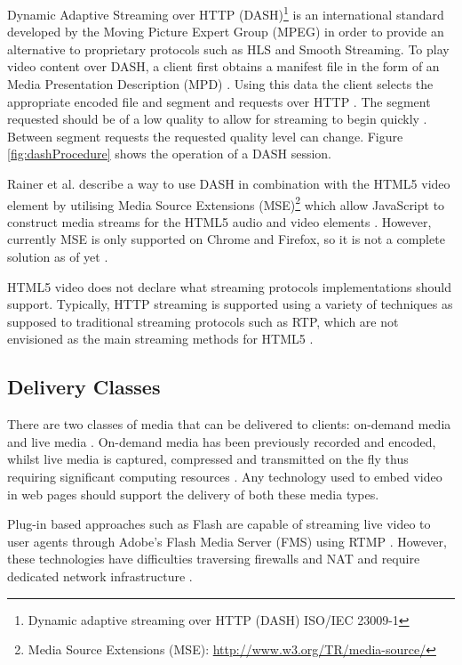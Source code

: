 \documentclass[journal]{IEEEtran}
\begin{document}
Dynamic Adaptive Streaming over HTTP (DASH)\footnote{Dynamic
adaptive streaming over HTTP (DASH) ISO/IEC 23009-1} is an international standard developed by the Moving Picture Expert Group (MPEG) in order to provide an alternative to proprietary protocols such as HLS and Smooth Streaming. To play video content over DASH, a client first obtains a manifest file in the form of an Media Presentation Description (MPD) \cite{article:MPEGDASH}. Using this data the client selects the appropriate encoded file and segment and requests over HTTP \cite{article:MPEGDASH}. The segment requested should be of a low quality to allow for streaming to begin quickly \cite{inproceedings:dynamicAdapativeHTTPStreamingLive}. Between segment requests the requested quality level can change. Figure \ref{fig:dashProcedure} shows the operation of a DASH session.

Rainer et al. describe a way to use DASH in combination with the HTML5 video element by utilising Media Source Extensions (MSE)\footnote{Media Source Extensions (MSE): \url{http://www.w3.org/TR/media-source/}} which allow JavaScript to construct media streams for the HTML5 audio and video elements \cite{standard:mse} \cite{inproceedings:aSeamlessIntegrationOfAdaptiveHTTPStreaming}. However, currently MSE is only supported on Chrome and Firefox, so it is not a complete solution as of yet \cite{website:mdnMediaSource}.

HTML5 video does not declare what streaming protocols implementations should support. Typically, HTTP streaming is supported using a variety of techniques as supposed to traditional streaming protocols such as RTP, which are not envisioned as the main streaming methods for HTML5 \cite{article:towardsVideoOnTheWebWithHTML5}.

\subsection{Delivery Classes}
There are two classes of media that can be delivered to clients: on-demand media and live media \cite{techreport:aReviewOfHTTPLiveStreaming}. On-demand media has been previously recorded and encoded, whilst live media is captured, compressed and transmitted on the fly thus requiring significant computing resources \cite{techreport:aReviewOfHTTPLiveStreaming}. Any technology used to embed video in web pages should support the delivery of both these media types.

Plug-in based approaches such as Flash are capable of streaming live video to user agents through Adobe's Flash Media Server (FMS) using RTMP \cite{techreport:aReviewOfHTTPLiveStreaming}. However, these technologies have difficulties traversing firewalls and NAT and require dedicated network infrastructure \cite{inproceedings:dynamicAdapativeHTTPStreamingLive}. %
\end{document}
